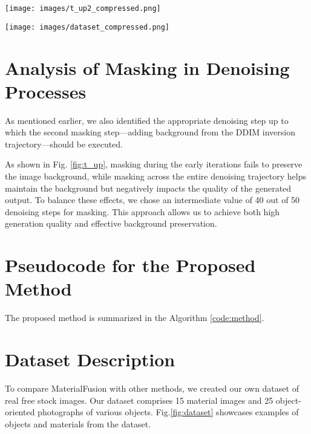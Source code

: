 \begin{figure*}[ht!]
  \centering
   \texttt{[image: images/t\_up2\_compressed.png]}
   \caption{
Identification of the optimal denoising step for executing the second masking — adding background from the DDIM inversion trajectory. By masking the first 40 out of 50 denoising steps in this manner, we effectively preserve the background while achieving high-quality generation
   }
   \label{fig:t_up}
\end{figure*}

\begin{figure*}[t!]
  \centering
   \texttt{[image: images/dataset\_compressed.png]}
   \caption{Examples of images from our custom dataset: (Left) Object images; (Right) Material images.}
   \label{fig:dataset}
   \vspace{-5pt}
\end{figure*}


\section{Analysis of Masking in Denoising Processes}
\label{appendix:masking} 



As mentioned earlier, we also identified the appropriate denoising step up to which the second masking step—adding background from the DDIM inversion trajectory—should be executed.

As shown in Fig. \ref{fig:t_up}, masking during the early iterations fails to preserve the image background, while masking across the entire denoising trajectory helps maintain the background but negatively impacts the quality of the generated output. To balance these effects, we chose an intermediate value of 40 out of 50 denoising steps for masking. This approach allows us to achieve both high generation quality and effective background preservation. 


\section{Pseudocode for the Proposed Method}
\label{appendix:code}
The proposed method is summarized in the Algorithm \ref{code:method}. %


\section{Dataset Description}
\label{appendix:dataset}
To compare MaterialFusion with other methods, we created our own dataset of real free stock images. Our dataset comprises 15 material images and 25 object-oriented photographs of various objects. Fig.\ref{fig:dataset} showcases examples of objects and materials from the dataset.




